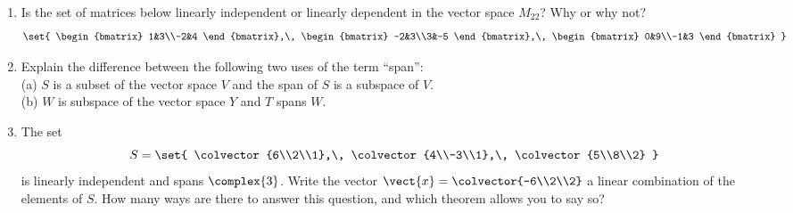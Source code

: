 \begin{enumerate}
%
\item Is the set of matrices below linearly independent or linearly dependent in the vector space $M_{22}$?  Why or why not?
%
\begin{equation*}
\set{
\begin{bmatrix}
1&3\\-2&4
\end{bmatrix},\,
\begin{bmatrix}
-2&3\\3&-5
\end{bmatrix},\,
\begin{bmatrix}
0&9\\-1&3
\end{bmatrix}
}
\end{equation*}
%
\item Explain the difference between the following two uses of the term ``span'':\\
(a) $S$ is a subset of the vector space $V$ and the span of $S$ is a subspace of $V$.\\
(b) $W$ is subspace of the vector space $Y$ and $T$ spans $W$.
%
\item The set 
%
\begin{equation*}
S=\set{
\colvector{6\\2\\1},\,
\colvector{4\\-3\\1},\,
\colvector{5\\8\\2}
}
\end{equation*}
%
is linearly independent and spans $\complex{3}$.  Write the vector 
$\vect{x}=\colvector{-6\\2\\2}$ a linear combination of the elements of $S$.  How many ways are there to answer this question, and which theorem allows you to say so?
%
\end{enumerate}